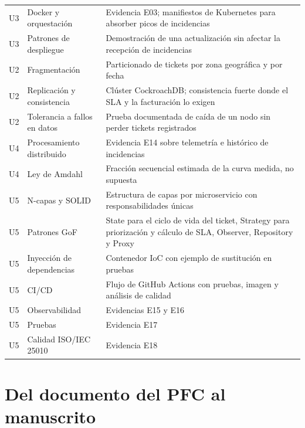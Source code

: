 \documentclass[11pt,a4paper]{article}
\begin{document}
\begin{center}
\begin{longtable}{@{}p{1.2cm}p{5.2cm}p{8.4cm}@{}}
		U3 & Docker y orquestación & Evidencia E03; manifiestos de Kubernetes para absorber picos de incidencias \\
		U3 & Patrones de despliegue & Demostración de una actualización sin afectar la recepción de incidencias \\
		\addlinespace
		U2 & Fragmentación & Particionado de tickets por zona geográfica y por fecha \\
		U2 & Replicación y consistencia & Clúster CockroachDB; consistencia fuerte donde el SLA y la facturación lo exigen \\
		U2 & Tolerancia a fallos en datos & Prueba documentada de caída de un nodo sin perder tickets registrados \\
		\addlinespace
		U4 & Procesamiento distribuido & Evidencia E14 sobre telemetría e histórico de incidencias \\
		U4 & Ley de Amdahl & Fracción secuencial estimada de la curva medida, no supuesta \\
		\addlinespace
		U5 & N-capas y SOLID & Estructura de capas por microservicio con responsabilidades únicas \\
		U5 & Patrones GoF & State para el ciclo de vida del ticket, Strategy para priorización y cálculo de SLA, Observer, Repository y Proxy \\
		U5 & Inyección de dependencias & Contenedor IoC con ejemplo de sustitución en pruebas \\
		U5 & CI/CD & Flujo de GitHub Actions con pruebas, imagen y análisis de calidad \\
		U5 & Observabilidad & Evidencias E15 y E16 \\
		U5 & Pruebas & Evidencia E17 \\
		U5 & Calidad ISO/IEC 25010 & Evidencia E18 \\
		\bottomrule
	\end{longtable}
\end{center}

\section{Del documento del PFC al manuscrito}
\end{document}
